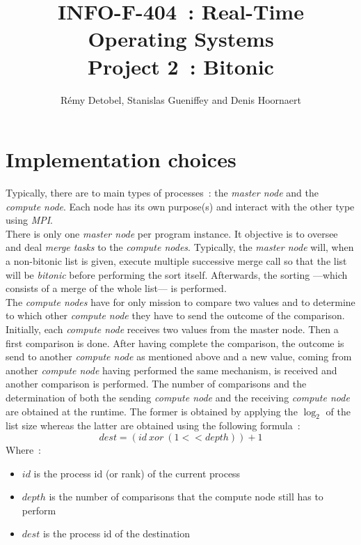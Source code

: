 \documentclass[a4paper,11pt]{article}
\title{INFO-F-404~: Real-Time Operating Systems\\Project 2~: Bitonic}
\author{Rémy Detobel, Stanislas Gueniffey and Denis Hoornaert}
\begin{document}
\maketitle

\section{Implementation choices}

  Typically, there are to main types of processes~: the \textit{master node} and the \textit{compute node}. Each node has its own purpose(s) and interact with the other type using \textit{MPI}.\\
  
  \noindent There is only one \textit{master node} per program instance. It objective is to oversee and deal \textit{merge tasks} to the \textit{compute nodes}. Typically, the \textit{master node} will, when a non-bitonic list is given, execute multiple successive merge call so that the list will be \textit{bitonic} before performing the sort itself. Afterwards, the sorting  ---which consists of a merge of the whole list--- is performed.\\
  
  \noindent The \textit{compute nodes} have for only mission to compare two values and to determine to which other \textit{compute node} they have to send the outcome of the comparison. Initially, each \textit{compute node} receives two values from the master node. Then a first comparison is done. After having complete the comparison, the outcome is send to another \textit{compute node} as mentioned above and a new value, coming from another \textit{compute node} having performed the same mechanism, is received and another comparison is performed. The number of comparisons and the determination of both the sending \textit{compute node} and the receiving \textit{compute node} are obtained at the runtime. The former is obtained by applying the $\log_{2}$ of the list size whereas the latter are obtained using the following formula~:
  \[dest = (id~xor~(1 << depth)) + 1\]
  Where~:
  \begin{itemize}
    \item $id$ is the process id (or rank) of the current process
    \item $depth$ is the number of comparisons that the compute node still has to perform
    \item $dest$ is the process id of the destination
  \end{itemize}
\end{document}

